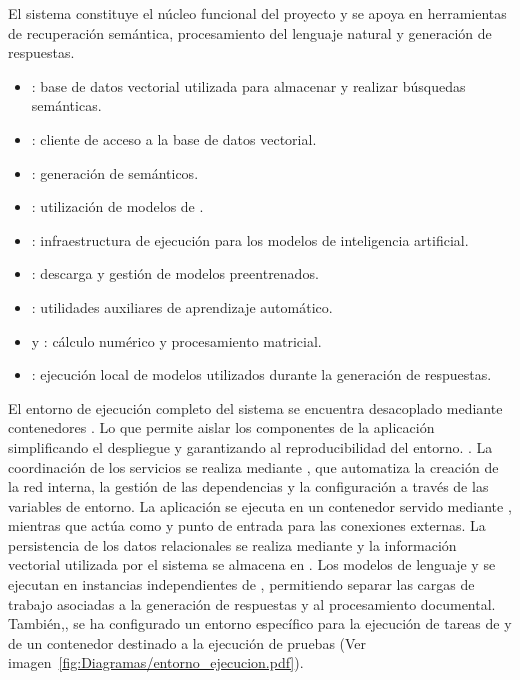 El sistema  constituye el núcleo funcional del proyecto y se apoya en herramientas de recuperación semántica, procesamiento del lenguaje natural y generación de respuestas.

\begin{itemize}
\tightlist
	\item {}: base de datos vectorial utilizada para almacenar  y realizar búsquedas semánticas.
	\item {}: cliente de acceso a la base de datos vectorial.
	\item {}: generación de  semánticos.
\item {}: utilización de modelos de .
	\item {}: infraestructura de ejecución para los modelos de inteligencia artificial.
	\item {}: descarga y gestión de modelos preentrenados.
	\item {}: utilidades auxiliares de aprendizaje automático.
	\item {} y : cálculo numérico y procesamiento matricial.
	\item {}: ejecución local de modelos  utilizados durante la generación de respuestas.
\end{itemize}

El entorno de ejecución completo del sistema se encuentra desacoplado mediante contenedores . Lo que permite aislar los componentes de la aplicación simplificando el despliegue y garantizando al reproducibilidad del entorno. . La coordinación de los servicios se realiza mediante , que automatiza la creación de la red interna, la gestión de las dependencias y la configuración a través de las variables de entorno. La aplicación  se ejecuta en un contenedor  servido mediante , mientras que  actúa como  y punto de entrada para las conexiones externas. La persistencia de los datos relacionales se realiza mediante  y la información vectorial utilizada por el sistema  se almacena en . Los modelos de lenguaje y  se ejecutan en instancias independientes de , permitiendo separar las cargas de trabajo asociadas a la generación de respuestas y al procesamiento documental. También,, se ha configurado un entorno específico para la ejecución de tareas de  y de un contenedor destinado a la ejecución de pruebas (Ver imagen~\ref{fig:Diagramas/entorno_ejecucion.pdf}).

